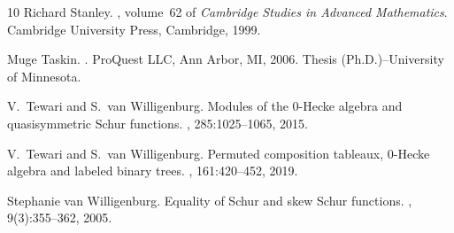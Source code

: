 \documentclass[12pt, reqno]{amsart}
\theoremstyle{definition}
\numberwithin{equation}{section} \numberwithin{figure}{section}
\numberwithin{table}{section}
\begin{document}
\begin{thebibliography}{10}
Richard Stanley.
, volume~62 of {\em
  Cambridge Studies in Advanced Mathematics}.
\newblock Cambridge University Press, Cambridge, 1999.

Muge Taskin.
.
\newblock ProQuest LLC, Ann Arbor, MI, 2006.
\newblock Thesis (Ph.D.)--University of Minnesota.

V.~Tewari and S.~van Willigenburg.
\newblock Modules of the {$0$}-{H}ecke algebra and quasisymmetric {S}chur
  functions.
, 285:1025--1065, 2015.

V.~Tewari and S.~van Willigenburg.
\newblock Permuted composition tableaux, {$0$}-{H}ecke algebra and labeled
  binary trees.
, 161:420--452, 2019.

Stephanie van Willigenburg.
\newblock Equality of {S}chur and skew {S}chur functions.
, 9(3):355--362, 2005.

\end{thebibliography}
\end{document}
